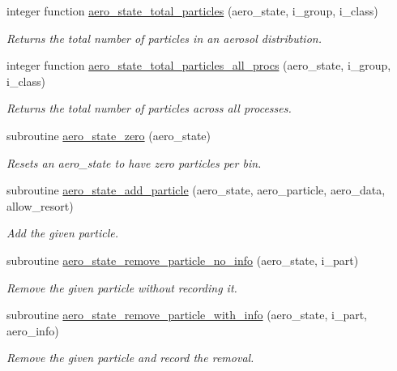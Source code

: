 \begin{DoxyCompactItemize}
integer function \mbox{\hyperlink{namespacepmc__aero__state_a9bfa000bf19e64be5f1cf5aeebabe535}{aero\+\_\+state\+\_\+total\+\_\+particles}} (aero\+\_\+state, i\+\_\+group, i\+\_\+class)
\begin{DoxyCompactList}\small\item\em Returns the total number of particles in an aerosol distribution. \end{DoxyCompactList}\item 
integer function \mbox{\hyperlink{namespacepmc__aero__state_a38cf96ea2f1a3ee938bda68e93975cae}{aero\+\_\+state\+\_\+total\+\_\+particles\+\_\+all\+\_\+procs}} (aero\+\_\+state, i\+\_\+group, i\+\_\+class)
\begin{DoxyCompactList}\small\item\em Returns the total number of particles across all processes. \end{DoxyCompactList}\item 
subroutine \mbox{\hyperlink{namespacepmc__aero__state_a748f903f70f90956fc02765c46f5e541}{aero\+\_\+state\+\_\+zero}} (aero\+\_\+state)
\begin{DoxyCompactList}\small\item\em Resets an aero\+\_\+state to have zero particles per bin. \end{DoxyCompactList}\item 
subroutine \mbox{\hyperlink{namespacepmc__aero__state_a473f49b7a4680623facd70a44576b7e8}{aero\+\_\+state\+\_\+add\+\_\+particle}} (aero\+\_\+state, aero\+\_\+particle, aero\+\_\+data, allow\+\_\+resort)
\begin{DoxyCompactList}\small\item\em Add the given particle. \end{DoxyCompactList}\item 
subroutine \mbox{\hyperlink{namespacepmc__aero__state_a87d926e9b2ca5930053d449d771efcee}{aero\+\_\+state\+\_\+remove\+\_\+particle\+\_\+no\+\_\+info}} (aero\+\_\+state, i\+\_\+part)
\begin{DoxyCompactList}\small\item\em Remove the given particle without recording it. \end{DoxyCompactList}\item 
subroutine \mbox{\hyperlink{namespacepmc__aero__state_ad28b72502e5bb9caa40eac383d9bb22e}{aero\+\_\+state\+\_\+remove\+\_\+particle\+\_\+with\+\_\+info}} (aero\+\_\+state, i\+\_\+part, aero\+\_\+info)
\begin{DoxyCompactList}\small\item\em Remove the given particle and record the removal. \end{DoxyCompactList}\item 

\end{DoxyCompactItemize}
